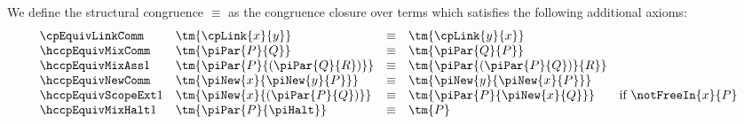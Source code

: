 \begin{definition}\label{def:hccp-equiv}
  We define the structural congruence $\equiv$ as the congruence closure over
  terms which satisfies the following additional axioms:
  \begin{gather*}
    \begin{array}{llcll}
      \cpEquivLinkComm
      & \tm{\cpLink{x}{y}}
      & \equiv
      & \tm{\cpLink{y}{x}}
      \\
      \hccpEquivMixComm
      & \tm{\piPar{P}{Q}}
      & \equiv
      & \tm{\piPar{Q}{P}}
      \\
      \hccpEquivMixAss1
      & \tm{\piPar{P}{( \piPar{Q}{R} )}}
      & \equiv
      & \tm{\piPar{( \piPar{P}{Q} )}{R}}
      \\
      \hccpEquivNewComm
      & \tm{\piNew{x}{\piNew{y}{P}}}
      & \equiv
      & \tm{\piNew{y}{\piNew{x}{P}}}
      \\
      \hccpEquivScopeExt1
      & \tm{\piNew{x}{( \piPar{P}{Q} )}}
      & \equiv
      & \tm{\piPar{P}{\piNew{x}{Q}}}
      & \text{if }\notFreeIn{x}{P} 
      \\
      \hccpEquivMixHalt1
      & \tm{\piPar{P}{\piHalt}}
      & \equiv
      & \tm{P}
    \end{array}
  \end{gather*}
\end{definition}
